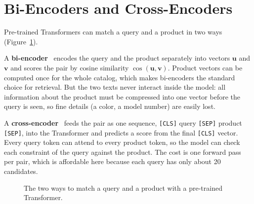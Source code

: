\documentclass[12pt,a4paper]{report}
\begin{document}
\section{Bi-Encoders and Cross-Encoders}
Pre-trained Transformers can match a query and a product in two ways (Figure~\ref{fig:encoders}).

A \textbf{bi-encoder}~\cite{sbert,bge} encodes the query and the product separately into vectors $\mathbf{u}$ and $\mathbf{v}$ and scores the pair by cosine similarity $\cos(\mathbf{u},\mathbf{v})$. Product vectors can be computed once for the whole catalog, which makes bi-encoders the standard choice for retrieval. But the two texts never interact inside the model: all information about the product must be compressed into one vector before the query is seen, so fine details (a color, a model number) are easily lost.

A \textbf{cross-encoder}~\cite{monobert} feeds the pair as one sequence, \texttt{[CLS]} query \texttt{[SEP]} product \texttt{[SEP]}, into the Transformer and predicts a score from the final \texttt{[CLS]} vector. Every query token can attend to every product token, so the model can check each constraint of the query against the product. The cost is one forward pass per pair, which is affordable here because each query has only about 20 candidates.

\begin{figure}[H]
\centering
{}
\caption{The two ways to match a query and a product with a pre-trained Transformer.}
\label{fig:encoders}
\end{figure}
\end{document}
